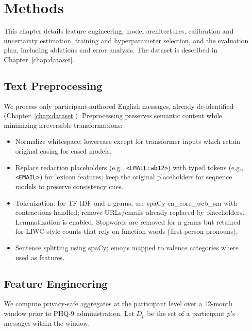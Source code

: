 \chapter{Methods}
\label{chap:methods}

This chapter details feature engineering, model architectures, calibration and uncertainty estimation, training and hyperparameter selection, and the evaluation plan, including ablations and error analysis. The dataset is described in Chapter~\ref{chap:dataset}.

\section{Text Preprocessing}
\label{sec:methods-preproc}
We process only participant-authored English messages, already de-identified (Chapter~\ref{chap:dataset}). Preprocessing preserves semantic content while minimizing irreversible transformations:
\begin{itemize}
  \item Normalize whitespace; lowercase except for transformer inputs which retain original casing for cased models.
  \item Replace redaction placeholders (e.g., \verb|<EMAIL:ab12>|) with typed tokens (e.g., \verb|<EMAIL>|) for lexicon features; keep the original placeholders for sequence models to preserve consistency cues.
  \item Tokenization: for TF-IDF and n-grams, use spaCy en\_core\_web\_sm with contractions handled; remove URLs/emails already replaced by placeholders. Lemmatization is enabled. Stopwords are removed for n-grams but retained for LIWC-style counts that rely on function words (first-person pronouns).
  \item Sentence splitting using spaCy; emojis mapped to valence categories where used as features.
\end{itemize}

\section{Feature Engineering}
\label{sec:methods-features}
We compute privacy-safe aggregates at the participant level over a 12-month window prior to PHQ-9 administration. Let \(D_p\) be the set of a participant \(p\)'s messages within the window.

